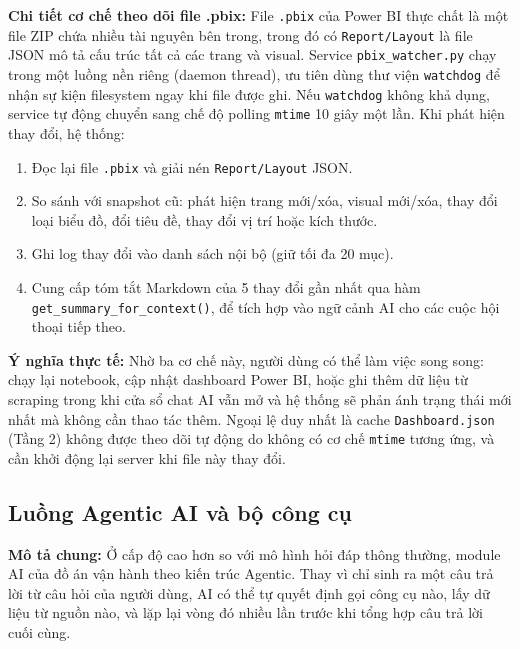 \noindent\textbf{Chi tiết cơ chế theo dõi file .pbix:}
File \texttt{.pbix} của Power BI thực chất là một file ZIP chứa nhiều tài nguyên bên trong, trong đó có \texttt{Report/Layout} là file JSON mô tả cấu trúc tất cả các trang và visual. Service \texttt{pbix\_watcher.py} chạy trong một luồng nền riêng (daemon thread), ưu tiên dùng thư viện \texttt{watchdog} để nhận sự kiện filesystem ngay khi file được ghi. Nếu \texttt{watchdog} không khả dụng, service tự động chuyển sang chế độ polling \texttt{mtime} 10 giây một lần. Khi phát hiện thay đổi, hệ thống:
\begin{enumerate}
    \item Đọc lại file \texttt{.pbix} và giải nén \texttt{Report/Layout} JSON.
    \item So sánh với snapshot cũ: phát hiện trang mới/xóa, visual mới/xóa, thay đổi loại biểu đồ, đổi tiêu đề, thay đổi vị trí hoặc kích thước.
    \item Ghi log thay đổi vào danh sách nội bộ (giữ tối đa 20 mục).
    \item Cung cấp tóm tắt Markdown của 5 thay đổi gần nhất qua hàm \texttt{get\_summary\_for\_\allowbreak context()}, để tích hợp vào ngữ cảnh AI cho các cuộc hội thoại tiếp theo.
\end{enumerate}

\noindent\textbf{Ý nghĩa thực tế:}
Nhờ ba cơ chế này, người dùng có thể làm việc song song: chạy lại notebook, cập nhật dashboard Power BI, hoặc ghi thêm dữ liệu từ scraping trong khi cửa sổ chat AI vẫn mở và hệ thống sẽ phản ánh trạng thái mới nhất mà không cần thao tác thêm. Ngoại lệ duy nhất là cache \texttt{Dashboard.json} (Tầng 2) không được theo dõi tự động do không có cơ chế \texttt{mtime} tương ứng, và cần khởi động lại server khi file này thay đổi.


\subsection{Luồng Agentic AI và bộ công cụ}
\label{subsec:ai_agentic}

\noindent\textbf{Mô tả chung:}
Ở cấp độ cao hơn so với mô hình hỏi đáp thông thường, module AI của đồ án vận hành theo kiến trúc Agentic. Thay vì chỉ sinh ra một câu trả lời từ câu hỏi của người dùng, AI có thể tự quyết định gọi công cụ nào, lấy dữ liệu từ nguồn nào, và lặp lại vòng đó nhiều lần trước khi tổng hợp câu trả lời cuối cùng.

